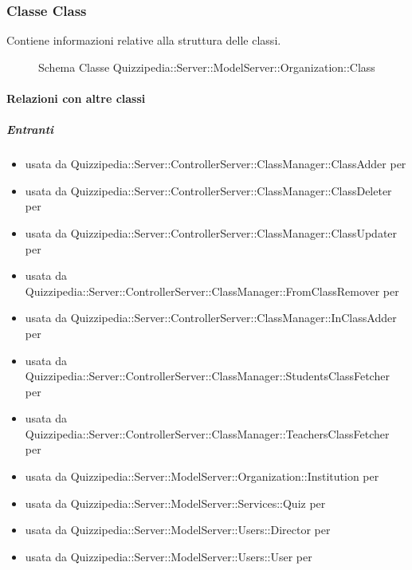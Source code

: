 \subsubsection{Classe Class}
Contiene informazioni relative alla struttura delle classi.
\begin{figure}[H]
\centering
\noindent{}
\caption[Schema Classe Class]{Schema Classe Quizzipedia::Server::ModelServer::Organization::Class}
\end{figure}
\paragraph{Relazioni con altre classi}
\subparagraph{Entranti}
\begin{itemize}
\item usata da Quizzipedia::Server::ControllerServer::ClassManager::ClassAdder per 
\item usata da Quizzipedia::Server::ControllerServer::ClassManager::ClassDeleter per 
\item usata da Quizzipedia::Server::ControllerServer::ClassManager::ClassUpdater per 
\item usata da Quizzipedia::Server::ControllerServer::ClassManager::FromClassRemover per 
\item usata da Quizzipedia::Server::ControllerServer::ClassManager::InClassAdder per 
\item usata da Quizzipedia::Server::ControllerServer::ClassManager::StudentsClassFetcher per 
\item usata da Quizzipedia::Server::ControllerServer::ClassManager::TeachersClassFetcher per 
\item usata da Quizzipedia::Server::ModelServer::Organization::Institution per 
\item usata da Quizzipedia::Server::ModelServer::Services::Quiz per 
\item usata da Quizzipedia::Server::ModelServer::Users::Director per 
\item usata da Quizzipedia::Server::ModelServer::Users::User per 
\end{itemize}

